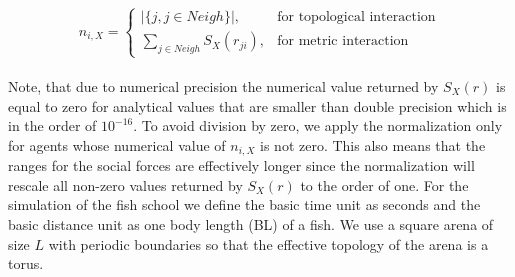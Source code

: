 	\begin{equation}
	n_{i,X} = \left\{\begin{array}{lc}
	|\{j, j \in Neigh\}|, & \text{for topological interaction}\\
	\sum_{j \in Neigh} S_X(r_{ji}), & \text{for metric interaction}
	\end{array}\right.
	\label{eq:neigh}
	\end{equation}\\
	Note, that due to numerical precision the numerical value returned by $S_X(r)$ is equal to zero for analytical values that are smaller than double precision which is in the order of $10^{-16}$.
	To avoid division by zero, we apply the normalization only for agents whose numerical value of $n_{i,X}$ is not zero.
	This also means that the ranges for the social forces are effectively longer since the normalization will rescale all non-zero values returned by $S_X(r)$ to the order of one.
	For the simulation of the fish school we define the basic time unit as seconds and the basic distance unit as one body length (BL) of a fish.
	We use a square arena of size $L$ with periodic boundaries so that the effective topology of the arena is a torus.
